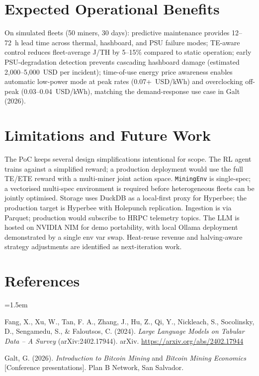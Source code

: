 \documentclass[11pt,a4paper]{article}
\begin{document}
\section{Expected Operational Benefits}
On simulated fleets (50 miners, 30 days): predictive maintenance provides
12--72~h lead time across thermal, hashboard, and PSU failure modes;
TE-aware control reduces fleet-average J/TH by 5--15\% compared to static
operation; early PSU-degradation detection prevents cascading hashboard
damage (estimated 2{,}000--5{,}000~USD per incident); time-of-use energy
price awareness enables automatic low-power mode at peak rates
(0.07{+}~USD/kWh) and overclocking off-peak (0.03--0.04~USD/kWh), matching
the demand-response use case in Galt (2026).

\section{Limitations and Future Work}
The PoC keeps several design simplifications intentional for scope. The RL
agent trains against a simplified reward; a production deployment would use
the full TE/ETE reward with a multi-miner joint action space.
\texttt{MiningEnv} is single-spec; a vectorised multi-spec environment is
required before heterogeneous fleets can be jointly optimised. Storage uses
DuckDB as a local-first proxy for Hyperbee; the production target is
Hyperbee with Holepunch replication. Ingestion is via Parquet; production
would subscribe to HRPC telemetry topics. The LLM is hosted on NVIDIA NIM
for demo portability, with local Ollama deployment demonstrated by a single
env var swap. Heat-reuse revenue and halving-aware strategy adjustments are
identified as next-iteration work.

\newpage
\pagestyle{empty}
\section*{References}
\begingroup
\setlength{\parindent}{-1.5em}
\leftskip=1.5em
\small

Fang, X., Xu, W., Tan, F. A., Zhang, J., Hu, Z., Qi, Y., Nickleach, S.,
Socolinsky, D., Sengamedu, S., \& Faloutsos, C. (2024). \emph{Large Language
Models on Tabular Data -- A Survey} (arXiv:2402.17944). arXiv.
\url{https://arxiv.org/abs/2402.17944}

Galt, G. (2026). \emph{Introduction to Bitcoin Mining} and \emph{Bitcoin
Mining Economics} [Conference presentations]. Plan B Network, San
Salvador.
\end{document}
